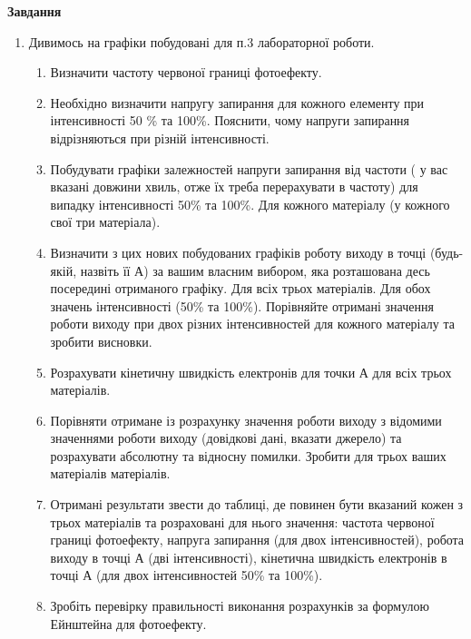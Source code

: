 \documentclass[a4paper,14pt]{extreport}
\begin{document}
\begin{center}\textbf{Завдання}\end{center}\par
	\begin{enumerate}
		\item 	Дивимось на графіки побудовані для п.3 лабораторної роботи.
		\begin{enumerate}[label=1.\arabic*]
			\item Визначити частоту червоної границі фотоефекту.
			\item Необхідно визначити напругу запирання для кожного елементу при інтенсивності 50 \% та 100\%.  Пояснити, чому напруги запирання відрізняються при різній інтенсивності.
			\item  Побудувати графіки залежностей напруги запирання від частоти ( у вас вказані довжини хвиль, отже їх треба перерахувати в частоту) для випадку інтенсивності 50\% та 100\%.  Для кожного матеріалу (у кожного свої три матеріала).
			\item Визначити з цих нових побудованих графіків роботу виходу в точці (будь-якій, назвіть її А) за вашим власним вибором, яка розташована десь посередині отриманого графіку. Для всіх трьох матеріалів. Для обох значень інтенсивності (50\% та 100\%). Порівняйте отримані значення роботи виходу при двох різних інтенсивностей для кожного матеріалу та зробити висновки.
			\item  Розрахувати кінетичну швидкість електронів для точки А для всіх трьох матеріалів.
			\item  Порівняти отримане із розрахунку значення роботи виходу з відомими значеннями роботи виходу (довідкові дані, вказати джерело) та розрахувати абсолютну та відносну помилки. Зробити для трьох ваших матеріалів матеріалів.
			\item  Отримані результати звести до таблиці, де повинен бути вказаний кожен з трьох матеріалів та розраховані для нього значення: частота червоної границі фотоефекту, напруга запирання (для двох інтенсивностей), робота виходу в точці А (дві інтенсивності), кінетична швидкість електронів в точці А (для двох інтенсивностей 50\% та 100\%).
			\item Зробіть перевірку правильності виконання розрахунків за формулою Ейнштейна для фотоефекту.
		\end{enumerate}


\end{enumerate}
\end{document}
